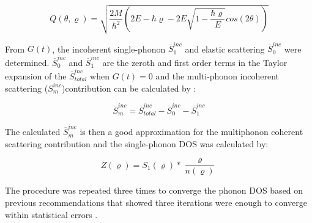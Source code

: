 \begin{equation}
\label{eq: Q}
Q(\theta, \varrho) = \sqrt{\frac{2M}{\hbar^{2}} \left( 2E - \hbar \varrho - 2E \sqrt{1-\frac{\hbar \varrho}{E}}cos(2\theta) \right)}
\end{equation}

\noindent From $G(t)$, the incoherent single-phonon $\overline{S}_{1}^{inc}$ and elastic scattering $\overline{S}_{0}^{inc}$ were determined.  $\overline{S}_{0}^{inc}$ and $\overline{S}_{1}^{inc}$ are the zeroth and first order terms in the Taylor expansion of the $\overline{S}_{total}^{inc}$ when $G(t)=0$ and the multi-phonon incoherent scattering ($S_{m}^{inc}$)contribution can be calculated by \cite{Manley2001,Manley2002}:

\begin{equation}
\label{eq: S_inco}
\overline{S}_{m}^{inc} = \overline{S}_{total}^{inc}-\overline{S}_{0}^{inc}-\overline{S}_{1}^{inc}
\end{equation}

\noindent The calculated $\overline{S}_{m}^{inc}$ is then a good approximation for the multiphonon coherent scattering contribution and the single-phonon DOS was calculated by:

\begin{equation}
\label{eq: onephonon}
Z(\varrho) = S_{1}(\varrho)* \frac{\varrho}{n(\varrho)}
\end{equation}

\noindent The procedure was repeated three times to converge the phonon DOS based on previous recommendations that showed three iterations were enough to converge within statistical errors \cite{Manley2001,Manley2002}.
